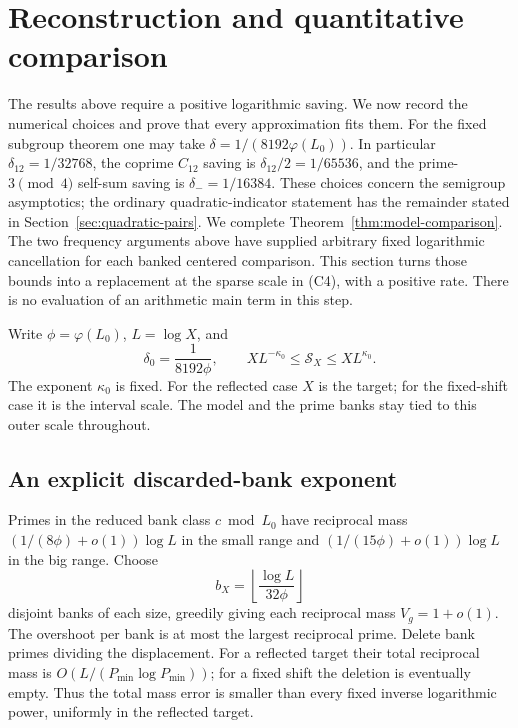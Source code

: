\section{Reconstruction and quantitative comparison}\label{sec:assembly}

The results above require a positive logarithmic saving. We now record
the numerical choices and prove that every approximation fits them.
For the fixed subgroup theorem one may take
\(\delta=1/(8192\varphi(L_0))\). In particular
\(\delta_{12}=1/32768\), the coprime \(C_{12}\) saving is
\(\delta_{12}/2=1/65536\), and the prime-\(3\pmod4\) self-sum
saving is \(\delta_-=1/16384\). These choices concern the
semigroup asymptotics; the ordinary quadratic-indicator statement
has the remainder stated in Section~\ref{sec:quadratic-pairs}.
We complete Theorem~\ref{thm:model-comparison}. The two frequency
arguments above have supplied arbitrary fixed logarithmic cancellation
for each banked centered comparison. This section turns those bounds
into a replacement at the sparse scale in (C4), with a positive rate.
There is no evaluation of an arithmetic main term in this step.

Write \(\phi=\varphi(L_0)\), \(L=\log X\), and
\[
 \delta_0=\frac1{8192\phi},\qquad
 XL^{-\kappa_0}\le\mathcal S_X\le XL^{\kappa_0}.
\]
The exponent \(\kappa_0\) is fixed. For the reflected case \(X\)
is the target; for the fixed-shift case it is the interval scale.
The model and the prime banks stay tied to this outer scale throughout.

\subsection{An explicit discarded-bank exponent}
Primes in the reduced bank class \(c\bmod L_0\) have reciprocal
mass \((1/(8\phi)+o(1))\log L\) in the small range and
\((1/(15\phi)+o(1))\log L\) in the big range. Choose
\[
 b_X=\left\lfloor\frac{\log L}{32\phi}\right\rfloor
\]
disjoint banks of each size, greedily giving each reciprocal mass
\(V_g=1+o(1)\). The overshoot per bank is at most the largest
reciprocal prime. Delete bank primes dividing the displacement.
For a reflected target their total reciprocal mass is
\(O(L/(P_{\min}\log P_{\min}))\); for a fixed shift the deletion
is eventually empty. Thus the total mass error is smaller than every
fixed inverse logarithmic power, uniformly in the reflected target.


